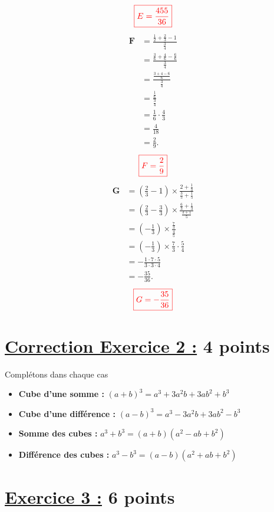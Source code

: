 \documentclass[12pt,a4paper]{article}
\begin{document}
$$\textcolor{red}{\boxed{E=\frac{455}{36}}}$$
\begin{align*}
\textbf{F} &= \frac{\frac{1}{2} + \frac{2}{3} - 1}{\frac{3}{4}} \\ 
           &= \frac{\frac{3}{6} + \frac{4}{6} - \frac{6}{6}}{\frac{3}{4}} \\ 
           &= \frac{\frac{3 + 4 - 6}{6}}{\frac{3}{4}} \\ 
           &= \frac{\frac{1}{6}}{\frac{3}{4}} \\ 
           &= \frac{1}{6} \cdot \frac{4}{3} \\ 
           &= \frac{4}{18} \\ 
           &= \frac{2}{9}.
\end{align*}
$$\textcolor{red}{\boxed{F=\frac{2}{9}}}$$
\begin{align*}
\textbf{G} &= \left(\frac{2}{3} - 1 \right) \times \frac{2 + \frac{1}{3}}{\frac{3}{5} + \frac{1}{5}} \\ 
           &= \left(\frac{2}{3} - \frac{3}{3} \right) \times \frac{\frac{6}{3} + \frac{1}{3}}{\frac{3 + 1}{5}} \\ 
           &= \left(-\frac{1}{3} \right) \times \frac{\frac{7}{3}}{\frac{4}{5}} \\ 
           &= \left(-\frac{1}{3} \right) \times \frac{7}{3} \cdot \frac{5}{4} \\ 
           &= -\frac{1 \cdot 7 \cdot 5}{3 \cdot 3 \cdot 4} \\ 
           &= -\frac{35}{36}.
\end{align*}
$$\textcolor{red}{\boxed{G=-\frac{35}{36}}}$$
\section*{\underline{Correction Exercice 2 :} 4 points}
Complétons dans chaque cas
\begin{itemize}
    \item \textbf{Cube d'une somme :} \quad $(a + b)^3 = a^3 + 3a^2b + 3ab^2 + b^3$
    \item \textbf{Cube d'une différence :} \quad $(a - b)^3 = a^3 - 3a^2b + 3ab^2 - b^3$
    \item \textbf{Somme des cubes :} \quad $a^3 + b^3 = (a + b)(a^2 - ab + b^2)$
    \item \textbf{Différence des cubes :} \quad $a^3 - b^3 = (a - b)(a^2 + ab + b^2)$
\end{itemize}
\section*{\underline{Exercice 3 :} 6 points}
\end{document}
